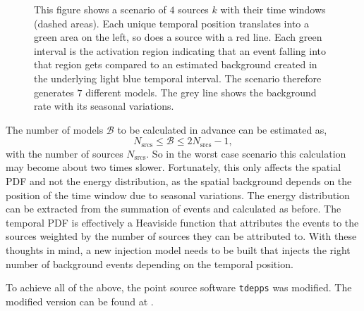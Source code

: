 \begin{figure}
{}
  \caption{This figure shows a scenario of $\num{4}$ sources $k$ with their time windows (dashed areas). Each unique temporal position translates into a green area on the left, so does a source with a red line. Each green interval is the activation region indicating that an event falling into that region gets compared to an estimated background created in the underlying light blue temporal interval. The scenario therefore generates $\num{7}$ different models. The grey line shows the background rate with its seasonal variations.}
  \label{fig:activation}
\end{figure}
The number of models $\mathcal{B}$ to be calculated in advance can be estimated as,
\begin{equation}
  N_{\text{srcs}} \leq \mathcal{B}\leq 2N_{\text{srcs}}-1, \label{eq:number_of_models}
\end{equation}
with the number of sources $N_{\text{srcs}}$.
So in the worst case scenario this calculation may become about two times slower.
Fortunately, this only affects the spatial PDF and not the energy distribution, as the spatial background depends on the position of the time window due to seasonal variations.
The energy distribution can be extracted from the summation of events and calculated as before.
The temporal PDF is effectively a Heaviside function that attributes the events to the sources weighted by the number of sources they can be attributed to.
With these thoughts in mind, a new injection model needs to be built that injects the right number of background events depending on the temporal position.

To achieve all of the above, the point source software \texttt{tdepps} \cite{tdepps_1} was modified.
The modified version can be found at \cite{tdepps_2}.


